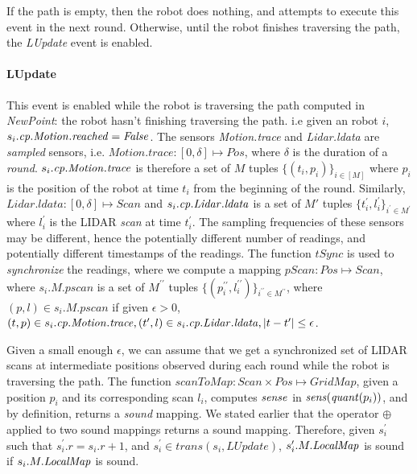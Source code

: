 If the path is empty, then the robot does nothing, and attempts to execute this event in the next round. Otherwise, until the robot finishes traversing the path, the \emph{LUpdate} event is enabled.

\paragraph{LUpdate}
This event is enabled while the robot is traversing the path computed in \emph{NewPoint}: the robot hasn't finishing traversing the path. i.e given an robot $i$, $s_i.\mathit{cp}.\mathit{Motion.reached}  = \mathit{False}$. The sensors \emph{Motion.trace} and \emph{Lidar.ldata} are \emph{sampled} sensors, i.e. $\mathit{Motion.trace}: [0,\delta] \mapsto \mathit{Pos}$, where $\delta$ is the duration of a \emph{round}. $s_i.\mathit{cp}.\mathit{Motion.trace}$ is therefore a set of $M$ tuples $\{(t_i, p_i)\}_{i \in [M]}$ where $p_i$ is the position of the robot at time $t_i$ from the beginning of the round. Similarly, $\mathit{Lidar.ldata} : [0,\delta]\mapsto \mathit{Scan}$ and $s_i.\mathit{cp}.\mathit{Lidar.ldata}$ is a set of $M'$ tuples $\{t_i^\prime, l_i^\prime\}_{i^\prime \in M^\prime}$ where $l_i^\prime$ is the LIDAR \emph{scan} at time $t_i^\prime$. The sampling frequencies of these sensors may be different, hence the potentially different number of readings, and potentially different timestamps of the readings. The function $\mathit{tSync}$ is used to \emph{synchronize} the readings, where we compute a mapping $\mathit{pScan}: \mathit{Pos} \mapsto \mathit{Scan}$, where $s_i.M.\mathit{pscan}$ is a set of $M^{\prime\prime}$ tuples $\{(p_i^{\prime\prime}, l_i^{\prime\prime})\}_{i^{\prime\prime} \in M ^{\prime\prime}}$, where  $(p, l) \in s_i.M.\mathit{pscan}$ if given $\epsilon > 0$,  $(t,p) \in s_i.\mathit{cp}.\mathit{Motion.trace}, (t^\prime,l )\in s_i.\mathit{cp}.\mathit{Lidar.ldata}, |t - t^\prime| \leq \epsilon$.

Given a small enough $\epsilon$, we can assume that we get a synchronized set of LIDAR scans at intermediate positions observed during each round while the robot is traversing the path. The function $\mathit{scanToMap}: \mathit{Scan} \times \mathit{Pos}\mapsto \mathit{GridMap}$, given a position $p_i$ and its corresponding scan $l_i$, computes $\mathit{sense}$ in $\mathit{sens}(\mathit{quant}(p_i))$, and by definition, returns a \emph{sound} mapping. We stated earlier that the operator $\oplus$ applied to two sound mappings returns a sound mapping. Therefore, given $s_i^\prime$ such that $s_i^\prime.r = s_i.r + 1$, and $\mathit{s_i^\prime \in \mathit{trans}(s_i,\mathit{LUpdate})}$,  $s_i^\prime.M.\mathit{LocalMap}$ is sound if $s_i.M.\mathit{LocalMap}$ is sound.

